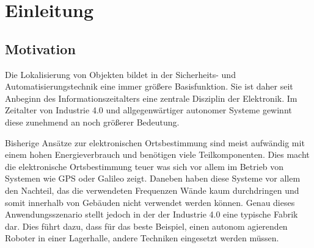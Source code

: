 
\chapter{Einleitung}
\label{sec:Einleitung}
\pagestyle{scrheadings}



\section{Motivation}
Die Lokalisierung von Objekten bildet in der Sicherheits- und Automatisierungstechnik eine immer größere Basisfunktion. Sie ist daher seit Anbeginn des Informationszeitalters eine zentrale Disziplin der Elektronik. Im Zeitalter von Industrie 4.0 und allgegenwärtiger autonomer Systeme gewinnt diese zunehmend an noch größerer Bedeutung. 

Bisherige Ansätze zur elektronischen Ortsbestimmung sind meist aufwändig mit einem hohen Energieverbrauch und benötigen viele Teilkomponenten. Dies macht die elektronische Ortsbestimmung teuer was sich vor allem im Betrieb von Systemen wie GPS oder Galileo zeigt. Daneben haben diese Systeme vor allem den Nachteil, das die verwendeten Frequenzen Wände kaum durchdringen und somit innerhalb von Gebäuden nicht verwendet werden können. Genau dieses Anwendungsszenario stellt jedoch in der der Industrie 4.0 eine typische Fabrik dar. Dies führt dazu, dass für das beste Beispiel, einen autonom agierenden Roboter in einer Lagerhalle, andere Techniken eingesetzt werden müssen. 

